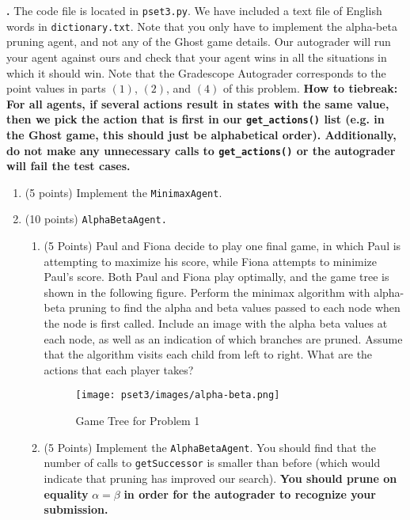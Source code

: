 \documentclass[12pt]{amsart}
\newenvironment{statement}[1]{\smallskip\noindent\color[rgb]{0.0,0.0,0.0} {\bf #1.}}{}
\newcommand{\1}{\mathds{1}}
\begin{document}
\begin{statement}{5}
\noindent
The code file is located in \texttt{pset3.py}. We have included a text file of English words in \texttt{dictionary.txt}. Note that you only have to implement the alpha-beta pruning agent, and not any of the Ghost game details. Our autograder will run your agent against ours and check that your agent wins in all the situations in which it should win. Note that the Gradescope Autograder corresponds to the point values in parts $(1)$, $(2)$, and $(4)$ of this problem.
\textbf{How to tiebreak: For all agents, if several actions result in states with the same value, then we pick the action that is first in our \texttt{get\_actions()} list (e.g. in the Ghost game, this should just be alphabetical order). Additionally, do not make any unnecessary calls to \texttt{get\_actions()} or the autograder will fail the test cases.}
\begin{enumerate}
    \item (5 points) Implement the \texttt{MinimaxAgent}.
    \item (10 points) \texttt{AlphaBetaAgent.} \begin{enumerate}
        \item (5 Points) Paul and Fiona decide to play one final game, in which Paul is attempting to maximize his score, while Fiona attempts to minimize Paul's score. Both Paul and Fiona play optimally, and the game tree is shown in the following figure. Perform the minimax algorithm with alpha-beta pruning to find the alpha and beta values passed to each node when the node is first called. Include an image with the alpha beta values at each node, as well as an indication of which branches are pruned. Assume that the algorithm visits each child from left to right. What are the actions that each player takes?
\vspace{-3mm}
 \begin{figure}[H]
        \centering
        \texttt{[image: pset3/images/alpha-beta.png]}
        \vspace{-5mm}
        \caption{Game Tree for Problem 1}
\end{figure}
\vspace{-5mm}
        \item (5 Points) Implement the \texttt{AlphaBetaAgent}. You should find that the number of calls to \texttt{getSuccessor} is smaller than before (which would indicate that pruning has improved our search).
    \textbf{You should prune on equality} $\alpha=\beta$ \textbf{in order for the autograder to recognize your submission.}
    \end{enumerate}

\end{enumerate}
\end{statement}
\end{document}
